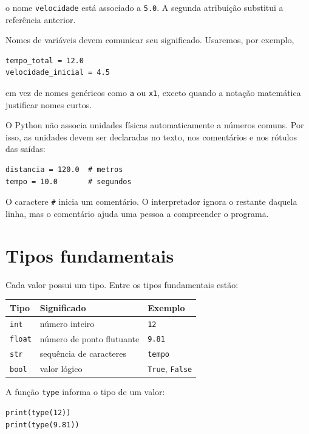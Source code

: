 o nome \texttt{velocidade} está associado a \texttt{5.0}. A segunda atribuição substitui a referência anterior.

Nomes de variáveis devem comunicar seu significado. Usaremos, por exemplo,

\begin{lstlisting}
tempo_total = 12.0
velocidade_inicial = 4.5
\end{lstlisting}

em vez de nomes genéricos como \texttt{a} ou \texttt{x1}, exceto quando a notação matemática justificar nomes curtos.

O Python não associa unidades físicas automaticamente a números comuns. Por isso, as unidades devem ser declaradas no texto, nos comentários e nos rótulos das saídas:

\begin{lstlisting}
distancia = 120.0  # metros
tempo = 10.0       # segundos
\end{lstlisting}

O caractere \texttt{\#} inicia um comentário. O interpretador ignora o restante daquela linha, mas o comentário ajuda uma pessoa a compreender o programa.

\section{Tipos fundamentais}

Cada valor possui um tipo. Entre os tipos fundamentais estão:

\begin{center}
\begin{tabular}{lll}
\toprule
Tipo & Significado & Exemplo\\
\midrule
\texttt{int} & número inteiro & \texttt{12}\\
\texttt{float} & número de ponto flutuante & \texttt{9.81}\\
\texttt{str} & sequência de caracteres & \texttt{tempo}\\
\texttt{bool} & valor lógico & \texttt{True}, \texttt{False}\\
\bottomrule
\end{tabular}
\end{center}

A função \texttt{type} informa o tipo de um valor:

\begin{lstlisting}
print(type(12))
print(type(9.81))
\end{lstlisting}

